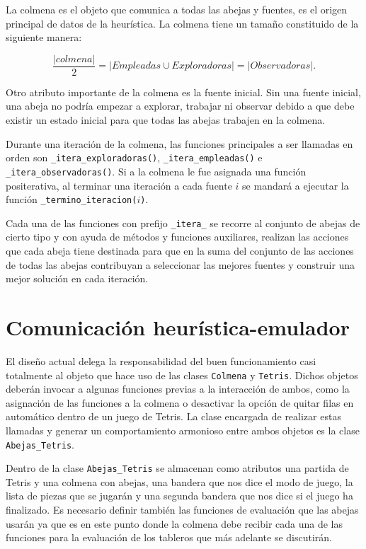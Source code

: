 La colmena es el objeto que comunica a todas las abejas y fuentes, es el origen  
principal de datos de la heurística. La colmena tiene un tamaño constituido de 
la siguiente manera: 

\begin{displaymath}
  \frac{|colmena|}{2} = |Empleadas \cup Exploradoras| = |Observadoras|.
\end{displaymath}

Otro atributo importante de la colmena es la fuente inicial. Sin una fuente 
inicial, una abeja no podría empezar a explorar, trabajar ni observar debido a 
que debe existir un estado inicial para que todas las abejas trabajen en la colmena. 



Durante una iteración de la colmena, las funciones principales a ser llamadas 
en orden son \texttt{\_itera\_exploradoras()}, \texttt{\_itera\_empleadas()} e 
\texttt{\_itera\_observadoras()}. Si a la colmena le fue asignada una 
función positerativa, al terminar una iteración a cada fuente $i$ se 
mandará a ejecutar la función \texttt{\_termino\_iteracion($i$)}.

Cada una de las funciones con prefijo \texttt{\_itera\_} se recorre al 
conjunto de abejas de cierto tipo y con ayuda de métodos y funciones 
auxiliares, realizan las acciones que cada abeja tiene destinada para que 
en la suma del conjunto de las acciones de todas las abejas contribuyan 
a seleccionar las mejores fuentes y construir una mejor solución en cada 
iteración.

\section{Comunicación heurística-emulador}

El diseño actual delega la responsabilidad del buen funcionamiento 
casi totalmente al objeto que hace uso de las clases 
\texttt{Colmena} y \texttt{Tetris}. Dichos objetos deberán invocar a 
algunas funciones previas a la interacción de ambos, como la 
asignación de las funciones a la colmena o desactivar la opción de 
quitar filas en automático dentro de un juego de Tetris. La clase 
encargada de realizar estas llamadas y generar un comportamiento 
armonioso entre ambos objetos es la clase \texttt{Abejas\_Tetris}. 




Dentro de la clase \texttt{Abejas\_Tetris} se almacenan como atributos 
una partida de Tetris y una colmena con abejas, una bandera que nos dice 
el modo de juego, la lista de piezas que se jugarán y una segunda bandera 
que nos dice si el juego ha finalizado. Es necesario definir también las 
funciones de evaluación que las abejas 
usarán ya que es en este punto donde la colmena debe recibir cada una 
de las funciones para la evaluación de los tableros que más adelante se 
discutirán.

